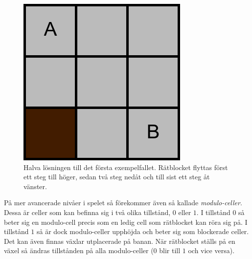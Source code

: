 \begin{figure}[!htb]
\endminipage\hfill
{}
\includegraphics[width=\linewidth]{4.png}
\endminipage
\caption{Halva lösningen till det första exempelfallet. Rätblocket flyttas först ett steg till höger, sedan två steg nedåt och till sist ett steg åt vänster.}
\end{figure}

På mer avancerade nivåer i spelet så förekommer även så kallade \emph{modulo-celler}. Dessa är celler som kan befinna sig i två olika tillstånd, $0$ eller $1$. I tillstånd $0$ så beter sig en modulo-cell precis som en ledig cell som rätblocket kan röra sig på. I tillstånd $1$ så är dock modulo-celler upphöjda och beter sig som blockerade celler. Det kan även finnas växlar utplacerade på banan. När rätblocket ställs på en växel så ändras tillstånden på alla modulo-celler ($0$ blir till $1$ och vice versa).

